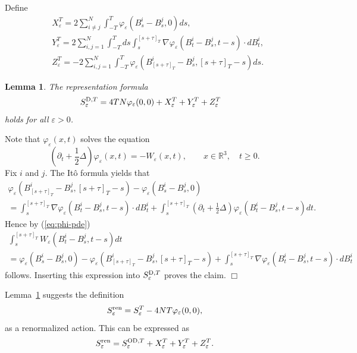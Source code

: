 \documentclass[12pt]{article}
\newtheorem{lemma}[theorem]{Lemma}
\providecommand{\eq}[1]{\begin{equation}\label{#1}}
\providecommand{\en}{\end{equation}}
\providecommand{\qed}{\hfill {$\Box$}\par\medskip}
\providecommand{\BR}{{\mathbb{R}^3 }}
\renewcommand{\ij}{\sum_{i\not=j}^N}
\providecommand{\od}{{\rm OD}}
\providecommand{\dd}{{\rm D}}
\providecommand{\lk}{\left(}
\providecommand{\rk}{\right)}
\providecommand{\1}{\mathbb{1}}
\providecommand{\dd}{\mathop{\mathrm{d}}\nolimits}
\providecommand{\eps}{\varepsilon}
\providecommand{\ren}{{\rm ren}}
\begin{document}
Define
\begin{align}
\label{eq:WI-renorm-1}
&X_\eps^T=2\ij  \int_{-T}^{T}\varphi_\eps(B_s^i-B_s^j,0) ds,\\
&Y_\eps^T=2\sum_{i,j=1}^N  \int_{-T}^{T} ds \int_s^{[s+\tau]_T}\nabla\varphi_\eps(B_t^i-B_s^j, t-s) \cdot dB_t^i,\\
\label{eq:WI-renorm-2}
&Z_\eps^T=-2\sum_{i,j=1}^N \int_{-T}^{T}\varphi_\eps(B_{[s+\tau]_T}^i-B_s^j, [s+\tau]_T-s)ds.
\end{align}


\begin{lemma}
\label{lem:WI-decomp}
The representation formula
\begin{align}
S_\eps^{\dd,T } & = 4TN \varphi_\eps(0,0) + X_\eps^T + Y_\eps^T  + Z_\eps^T
\label{eq:WI-decomp}
\end{align}
holds for all $\eps>0$.
\end{lemma}
\proof
Note that $\varphi_\eps(x,t)$ solves the equation
\begin{equation}
\label{eq:phi-pde}
\lk \partial_t  + \frac12 \Delta\rk  \varphi_\eps(x,t) = - W_\eps (x,t), \qquad x \in \BR, \quad t \ge 0.
\end{equation}
Fix $i$ and $j$. The  It\^o formula yields that
\begin{multline}
\label{eq:phi-eps-dec}
\varphi_\eps(B_{[s+\tau]_T}^i-B_s^j,[s+\tau]_T-s)-\varphi_\eps(B_s^i-B_s^j,0) \\
= \int_{s}^{[s+\tau]_T} \nabla \varphi_\eps(B_t^i-B_s^j,t-s)  \cdot dB_t^i
+ \int_{s}^{[s+\tau]_T}
\lk \partial_t + \frac{1}{2}\Delta\rk  \varphi_\eps(B_t^i-B_s^j,t-s) dt.
\end{multline}
Hence by (\ref{eq:phi-pde})
\begin{multline}
\label{eq:Wdec}
\int_{s}^{[s+\tau]_T} W_\eps (B_t^i-B_s^j,t-s) dt \\
= \varphi_\eps(B_s^i-B_s^j,0) -\varphi_\eps(B_{[s+\tau]_T}^i-B_s^j,[s+\tau]_T-s) +
\int_{s}^{[s+\tau]_T} \nabla\varphi_\eps(B_t^i-B_s^j,t-s)\cdot dB_t^i
\end{multline}
follows. Inserting this expression into $S_\eps^{\dd,T}$ proves the claim.
\qed
Lemma~\ref{lem:WI-decomp} suggests the definition
\eq{jozsef def}
S_\eps^\ren  = S_\eps^T - 4 NT\varphi_\eps(0,0),
\en
as a renormalized action.
This can be expressed as
\begin{align}
\label{eq:WI-renorm}
S_\eps^\ren
=
S_\eps^{\od,T }  +X_\eps^T +Y_\eps^T +Z_\eps^T.
\end{align}
\end{document}
